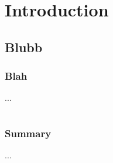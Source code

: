 \section{Introduction}

\subsection{Blubb}

\begin{frame}
  \frametitle{Blah}
  ...
\end{frame}

\section*{}

\begin{frame}
  \frametitle{Summary}
  ...
\end{frame}

